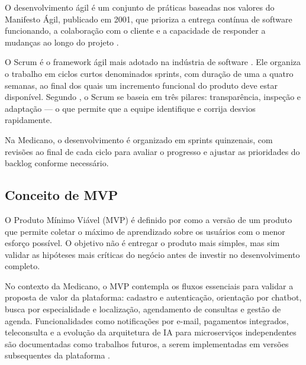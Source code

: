 O desenvolvimento ágil é um conjunto de práticas
baseadas nos valores do Manifesto Ágil, publicado
em 2001, que prioriza a entrega contínua de software
funcionando, a colaboração com o cliente e a
capacidade de responder a mudanças ao longo do
projeto \cite{agilemanifesto2001}.

O Scrum é o framework ágil mais adotado na indústria
de software \cite{schwaber2020}. Ele organiza o
trabalho em ciclos curtos denominados sprints, com
duração de uma a quatro semanas, ao final dos quais
um incremento funcional do produto deve estar
disponível. Segundo , o
Scrum se baseia em três pilares: transparência,
inspeção e adaptação — o que permite que a equipe
identifique e corrija desvios rapidamente.

Na Medicano, o desenvolvimento é organizado em
sprints quinzenais, com revisões ao final de cada
ciclo para avaliar o progresso e ajustar as
prioridades do backlog conforme necessário.

\subsection{Conceito de MVP}
\label{subsec:mvp}

O Produto Mínimo Viável (MVP) é definido por
 como a versão de um produto
que permite coletar o máximo de aprendizado sobre
os usuários com o menor esforço possível. O objetivo
não é entregar o produto mais simples, mas sim
validar as hipóteses mais críticas do negócio antes
de investir no desenvolvimento completo.

No contexto da Medicano, o MVP contempla os fluxos
essenciais para validar a proposta de valor da
plataforma: cadastro e autenticação, orientação por
chatbot, busca por especialidade e localização,
agendamento de consultas e gestão de agenda.
Funcionalidades como notificações por e-mail,
pagamentos integrados, teleconsulta e a evolução
da arquitetura de IA para microserviços independentes
são documentadas como trabalhos futuros, a serem
implementadas em versões subsequentes da plataforma
\cite{ries2011}.
